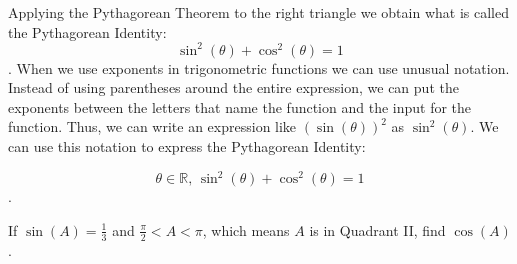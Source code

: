 Applying the Pythagorean Theorem to the right triangle we obtain what is called
the Pythagorean Identity:
\[ \sin^{2}(\theta) + \cos^{2}(\theta) = 1 \].
When we use exponents in trigonometric functions we can use unusual notation.
Instead of using parentheses around the entire expression, we can put the
exponents between the letters that name the function and the input for the
function. Thus, we can write an expression like $(\sin (\theta))^{2}$ as
$\sin^{2} (\theta)$. We can use this notation to express the Pythagorean
Identity:

\begin{notation}
  \[ \theta \in \mathbb{R} \textrm{, } \sin^{2} (\theta) + \cos^{2} (\theta) = 1 \].
\end{notation}

\begin{exc}
  \label{exc:find_cos}

  If $\sin (A) = \frac{1}{3}$ and $\frac{\pi}{2} < A < \pi$, which means $A$ is
  in Quadrant II, find $\cos (A)$.
\end{exc}

\newpage
